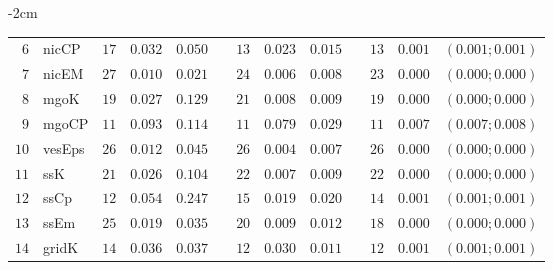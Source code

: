 \begin{table*}[!htbp]
\begin{adjustwidth*}{}{-2cm}
\begin{tabular}{@{}rlrrrrrrrrrcc@{}}
\footnotesize{$6 $} & \footnotesize{nicCP    } & \footnotesize{$17$} & \footnotesize{$0.032$} & \footnotesize{$0.050$} && \footnotesize{$13$} & \footnotesize{$0.023$} & \footnotesize{$0.015$} && \footnotesize{$13$} & \footnotesize{$0.001$} & \footnotesize{$(0.001;0.001)$} \\
\footnotesize{$7 $} & \footnotesize{nicEM    } & \footnotesize{$27$} & \footnotesize{$0.010$} & \footnotesize{$0.021$} && \footnotesize{$24$} & \footnotesize{$0.006$} & \footnotesize{$0.008$} && \footnotesize{$23$} & \footnotesize{$0.000$} & \footnotesize{$(0.000;0.000)$} \\
\footnotesize{$8 $} & \footnotesize{mgoK     } & \footnotesize{$19$} & \footnotesize{$0.027$} & \footnotesize{$0.129$} && \footnotesize{$21$} & \footnotesize{$0.008$} & \footnotesize{$0.009$} && \footnotesize{$19$} & \footnotesize{$0.000$} & \footnotesize{$(0.000;0.000)$} \\
\footnotesize{$9 $} & \footnotesize{mgoCP    } & \footnotesize{$11$} & \footnotesize{$0.093$} & \footnotesize{$0.114$} && \footnotesize{$11$} & \footnotesize{$0.079$} & \footnotesize{$0.029$} && \footnotesize{$11$} & \footnotesize{$0.007$} & \footnotesize{$(0.007;0.008)$} \\
\footnotesize{$10$} & \footnotesize{vesEps   } & \footnotesize{$26$} & \footnotesize{$0.012$} & \footnotesize{$0.045$} && \footnotesize{$26$} & \footnotesize{$0.004$} & \footnotesize{$0.007$} && \footnotesize{$26$} & \footnotesize{$0.000$} & \footnotesize{$(0.000;0.000)$} \\
\footnotesize{$11$} & \footnotesize{ssK      } & \footnotesize{$21$} & \footnotesize{$0.026$} & \footnotesize{$0.104$} && \footnotesize{$22$} & \footnotesize{$0.007$} & \footnotesize{$0.009$} && \footnotesize{$22$} & \footnotesize{$0.000$} & \footnotesize{$(0.000;0.000)$} \\
\footnotesize{$12$} & \footnotesize{ssCp     } & \footnotesize{$12$} & \footnotesize{$0.054$} & \footnotesize{$0.247$} && \footnotesize{$15$} & \footnotesize{$0.019$} & \footnotesize{$0.020$} && \footnotesize{$14$} & \footnotesize{$0.001$} & \footnotesize{$(0.001;0.001)$} \\
\footnotesize{$13$} & \footnotesize{ssEm     } & \footnotesize{$25$} & \footnotesize{$0.019$} & \footnotesize{$0.035$} && \footnotesize{$20$} & \footnotesize{$0.009$} & \footnotesize{$0.012$} && \footnotesize{$18$} & \footnotesize{$0.000$} & \footnotesize{$(0.000;0.000)$} \\
\footnotesize{$14$} & \footnotesize{gridK    } & \footnotesize{$14$} & \footnotesize{$0.036$} & \footnotesize{$0.037$} && \footnotesize{$12$} & \footnotesize{$0.030$} & \footnotesize{$0.011$} && \footnotesize{$12$} & \footnotesize{$0.001$} & \footnotesize{$(0.001;0.001)$} \\

\end{tabular}
\end{adjustwidth*}
\end{table*}
